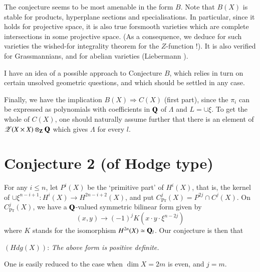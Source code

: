 The conjecture seems to be most amenable in the form $B$. Note that $B(X)$ is stable for products, hyperplane sections and specialisations. In particular, since it holds for projective space, it is also true for\pageoriginale smooth varieties which are complete intersections in some projective space. (As a consequence, we deduce for such varieties the wished-for integrality theorem for the $Z$-function !). It is also verified for Grassmannians, and for abelian varieties (Liebermann \cite{art09-key3}).

I have an idea of a possible approach to Conjecture $B$, which relies in turn on certain unsolved geometric questions, and which should be settled in any case.

Finally, we have the implication $B(X)\Rightarrow C(X)$ (first part), since the $\pi_{i}$ can be expressed as polynomials with coefficients in $\mathbf{Q}$ of $\Lambda$ and $L=\cup \xi$. To get the whole of $C(X)$, one should naturally assume further that there is an element of $\mathscr{Z}(X\times X)\otimes_{\mathbf{Z}}\mathbf{Q}$ which gives $\Lambda$ for every $l$.

\section{Conjecture 2 (of Hodge type)}\label{art09-sec4}

For any $i\leq n$, let $P^{i}(X)$ be the `primitive part' of $H^{i}(X)$, that is, the kernel of $\cup \xi^{n-i+1}:H^{i}(X)\to H^{2n-i+2}(X)$, and put $C^{j}_{\Pr}(X)=P^{2j}\cap C^{j}(X)$. On $C^{j}_{\Pr}(X)$, we have a $\mathbf{Q}$-valued symmetric bilinear form given by
$$
(x,y)\to (-1)^{j}K(x\cdot y\cdot \xi^{n-2j})
$$
where $K$ stands for the isomorphism $H^{2n}(X)\simeq \mathbf{Q}_{l}$. Our conjecture is then that

$(Hdg(X))$: {\em The above form is positive definite.}

One is easily reduced to the case when $\dim X=2m$ is even, and $j=m$.

